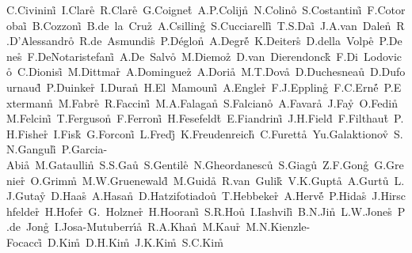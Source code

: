 \documentclass[12pt,a4paper,dvips]{article}
\begin{document}
{C.Civinini\r\tute\florence\ 
I.Clare\r\tute\mit\
R.Clare\r\tute\mit\ 
G.Coignet\r\tute\lapp\ 
A.P.Colijn\r\tute\nikhef\
N.Colino\r\tute\madrid\ 
S.Costantini\r\tute\basel\ 
F.Cotorobai\r\tute\bucharest\
B.Cozzoni\r\tute\bologna\ 
B.de~la~Cruz\r\tute\madrid\
A.Csilling\r\tute\budapest\
S.Cucciarelli\r\tute\perugia\ 
T.S.Dai\r\tute\mit\ 
J.A.van~Dalen\r\tute\nymegen\ 
R.D'Alessandro\r\tute\florence\            
R.de~Asmundis\r\tute\naples\
P.D\'eglon\r\tute\geneva\ 
A.Degr\'e\r\tute{\lapp}\ 
K.Deiters\r\tute{\psinst}\ 
D.della~Volpe\r\tute\naples\ 
P.Denes\r\tute\prince\ 
F.DeNotaristefani\r\tute\rome\
A.De~Salvo\r\tute\eth\ 
M.Diemoz\r\tute\rome\ 
D.van~Dierendonck\r\tute\nikhef\
F.Di~Lodovico\r\tute\eth\
C.Dionisi\r\tute{\rome}\ 
M.Dittmar\r\tute\eth\
A.Dominguez\r\tute\ucsd\
A.Doria\r\tute\naples\
M.T.Dova\r\tute{\wl,\sharp}\
D.Duchesneau\r\tute\lapp\ 
D.Dufournaud\r\tute\lapp\ 
P.Duinker\r\tute{\nikhef}\ 
I.Duran\r\tute\santiago\
H.El~Mamouni\r\tute\lyon\
A.Engler\r\tute\cmu\ 
F.J.Eppling\r\tute\mit\ 
F.C.Ern\'e\r\tute{\nikhef}\ 
P.Extermann\r\tute\geneva\ 
M.Fabre\r\tute\psinst\    
R.Faccini\r\tute\rome\
M.A.Falagan\r\tute\madrid\
S.Falciano\r\tute{\rome,\cern}\
A.Favara\r\tute\cern\
J.Fay\r\tute\lyon\         
O.Fedin\r\tute\peters\
M.Felcini\r\tute\eth\
T.Ferguson\r\tute\cmu\ 
F.Ferroni\r\tute{\rome}\
H.Fesefeldt\r\tute\aachen\ 
E.Fiandrini\r\tute\perugia\
J.H.Field\r\tute\geneva\ 
F.Filthaut\r\tute\cern\
P.H.Fisher\r\tute\mit\
I.Fisk\r\tute\ucsd\
G.Forconi\r\tute\mit\ 
L.Fredj\r\tute\geneva\
K.Freudenreich\r\tute\eth\
C.Furetta\r\tute\milan\
Yu.Galaktionov\r\tute{\moscow,\mit}\
S.N.Ganguli\r\tute{\tata}\ 
P.Garcia-Abia\r\tute\basel\
M.Gataullin\r\tute\caltech\
S.S.Gau\r\tute\ne\
S.Gentile\r\tute{\rome,\cern}\
N.Gheordanescu\r\tute\bucharest\
S.Giagu\r\tute\rome\
Z.F.Gong\r\tute{\hefei}\
G.Grenier\r\tute\lyon\ 
O.Grimm\r\tute\eth\ 
M.W.Gruenewald\r\tute\berlin\ 
M.Guida\r\tute\salerno\ 
R.van~Gulik\r\tute\nikhef\
V.K.Gupta\r\tute\prince\ 
A.Gurtu\r\tute{\tata}\
L.J.Gutay\r\tute\purdue\
D.Haas\r\tute\basel\
A.Hasan\r\tute\cyprus\      
D.Hatzifotiadou\r\tute\bologna\
T.Hebbeker\r\tute\berlin\
A.Herv\'e\r\tute\cern\ 
P.Hidas\r\tute\budapest\
J.Hirschfelder\r\tute\cmu\
H.Hofer\r\tute\eth\ 
G.~Holzner\r\tute\eth\ 
H.Hoorani\r\tute\cmu\
S.R.Hou\r\tute\taiwan\
I.Iashvili\r\tute\zeuthen\
B.N.Jin\r\tute\beijing\ 
L.W.Jones\r\tute\mich\
P.de~Jong\r\tute\nikhef\
I.Josa-Mutuberr{\'\i}a\r\tute\madrid\
R.A.Khan\r\tute\wl\ 
M.Kaur\r\tute{\wl,\diamondsuit}\
M.N.Kienzle-Focacci\r\tute\geneva\
D.Kim\r\tute\rome\
D.H.Kim\r\tute\korea\
J.K.Kim\r\tute\korea\
S.C.Kim\r\tute\korea\
}
\end{document}
